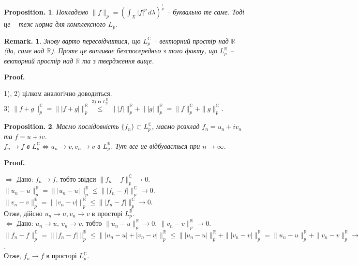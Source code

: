 \documentclass[a4paper, 10pt]{article}
\makeatletter
\def\rightproof{$\boxed{\Rightarrow}$ }
\def\leftproof{$\boxed{\Leftarrow}$ }
\theoremstyle{theoremdd}
\newtheorem*{proposition*}{Proposition.}
\newtheorem*{remark*}{Remark.}
\renewenvironment{proof}[1][Proof.\\]{\par
\pushQED{\hfill \qed}%
\normalfont \topsep6\p@\@plus6\p@\relax
\trivlist
\item\relax
{\bfseries
#1\@addpunct{.}}\hspace\labelsep\ignorespaces
}{%
\popQED\endtrivlist\@endpefalse
}
\makeatother
\begin{document}
\begin{proposition*}
Покладемо $\|f\|_p = \displaystyle \left( \int_X |f|^p\,d\lambda \right)^{\frac{1}{p}}$ -- буквально те саме. Тоді це -- теж норма для комплексного $L_p$.
\end{proposition*}

\begin{remark*}
Знову варто пересвідчитися, що $L_p^{\mathbb{C}}$ -- векторний простір над $\mathbb{R}$ (да, саме над $\mathbb{R}$). Проте це випливає безспосередньо з того факту, що $L_p^{\mathbb{R}}$ -- векторний простір над $\mathbb{R}$ та з твердження вище.
\end{remark*}

\begin{proof}
1), 2) цілком аналогічно доводиться.\\
3) $\|f+g\|_p^{\mathbb{C}} = \| |f+g| \|_p^{\mathbb{R}} \overset{\text{3) із } L_p^{\mathbb{R}}}{\leq} \| |f| \|_p^{\mathbb{R}} + \| |g| \|_p^{\mathbb{R}} = \|f\|_p^{\mathbb{C}} + \|g\|_p^{\mathbb{C}}$.
\end{proof}

\begin{proposition*}
Маємо послідовність $\{f_n\} \subset L_p^{\mathbb{C}}$, маємо розклад $f_n = u_n + iv_n$ та $f = u + iv$.\\
$f_n \to f$ в $L_p^{\mathbb{C}} \iff u_n \to v, v_n \to v$ в $L_p^{\mathbb{R}}$. Тут все це відбувається при $n \to \infty$.
\end{proposition*}

\begin{proof}
\rightproof Дано: $f_n \to f$, тобто звідси $\|f_n-f\|_p^{\mathbb{C}} \to 0$.\\
$\| u_n - u\|_p^{\mathbb{R}} = \| |u_n - u| \|_p^{\mathbb{R}} \leq \| |f_n-f| \|_p^{\mathbb{C}} \to 0$.\\
$\| v_n - v\|_p^{\mathbb{R}} = \| |v_n -v| \|_p^{\mathbb{R}} \leq \| |f_n-f| \|_p^{\mathbb{C}} \to 0$.\\
Отже, дійсно $u_n \to u, v_n \to v$ в просторі $L_p^{\mathbb{R}}$.
\bigskip \\
\leftproof Дано: $u_n \to u,\ v_n \to v$, тобто $\|u_n-u\|_p^{\mathbb{R}} \to 0,\ \|v_n - v\|_p^{\mathbb{R}} \to 0$.\\
$\|f_n - f\|_p^{\mathbb{C}} = \| |f_n - f| \|_p^{\mathbb{R}} \leq \| |u_n - u| + |v_n - v| \|_{p}^{\mathbb{R}} \leq \| |u_n - u| \|_p^{\mathbb{R}} + \| |v_n - v| \|_p^{\mathbb{R}} = \| u_n - u \|_p^{\mathbb{R}} + \| v_n - v \|_p^{\mathbb{R}} \to 0$.\\
Отже, $f_n \to f$ в просторі $L_p^{\mathbb{C}}$.
\end{proof}
\end{document}
